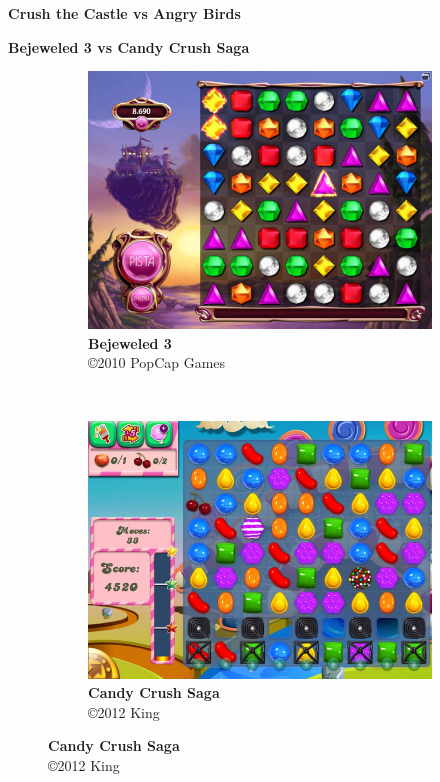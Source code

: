 \expandafter\documentclass\expandafter[table, usenames, svgnames, dvipsnames, \classopts]{beamer}
\begin{document}
\begin{frame}{\textbf{Crush the Castle vs Angry Birds}}

\end{frame}

\begin{frame}{\textbf{Bejeweled 3 vs Candy Crush Saga}}

	\begin{figure}
	    \centering

	    \begin{subfigure}[!h]{0.4\paperwidth}
	    	\centering
	    	\includegraphics[draft,height=0.4\paperheight]{bejeweled-screenshot}
	        \caption{\scriptsize\textbf{Bejeweled 3}\\\copyright{2010} PopCap Games\footnotemark{}}
	    \end{subfigure}
	    ~
		\begin{subfigure}[!h]{0.4\paperwidth}
			\centering
	        \includegraphics[draft,height=0.4\paperheight]{candy-crush-screenshot}
	        \caption{\scriptsize\textbf{Candy Crush Saga}\\\copyright{2012} King\footnotemark{}}
	    \end{subfigure}
    \end{figure}


\end{frame}
\end{document}
